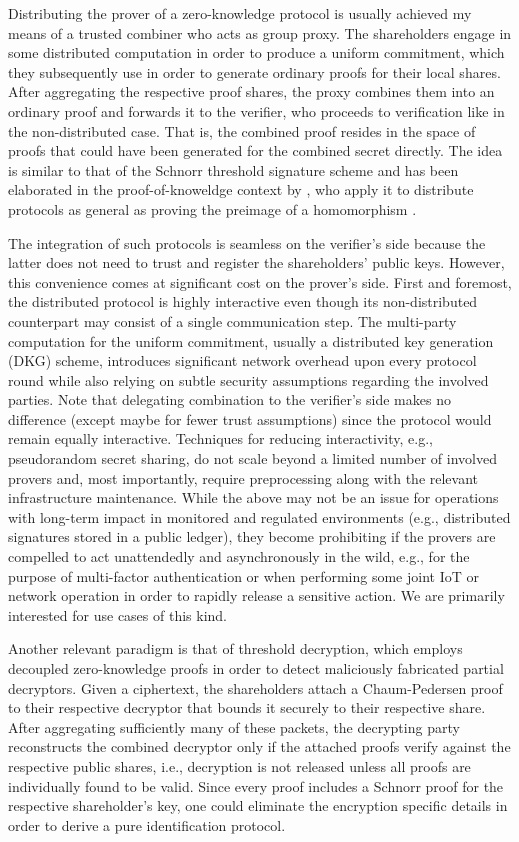 \documentclass[10pt, psamsfonts, reqno]{amsart}
\theoremstyle{definition}
\theoremstyle{remark}
\numberwithin{equation}{section}
\begin{document}
Distributing the prover of a zero-knowledge protocol
is usually achieved my means of a trusted combiner
who acts as group proxy.
The shareholders engage in some distributed computation
in order to produce a uniform commitment,
which they subsequently use in order to generate
ordinary proofs for their local shares.
After aggregating
the respective proof shares,
the proxy combines them into an ordinary proof
and forwards it to the verifier,
who proceeds to verification like in the non-distributed case.
That is, the combined proof resides in the space of proofs
that could have been generated for the combined secret directly.
The idea is similar to that of the
Schnorr threshold signature scheme
\cite{paper_stinson_strobl}
and has been elaborated
in the proof-of-knoweldge context by \cite{paper_threshold_zk},
who apply it to distribute protocols as general as
proving the preimage of a homomorphism \cite{paper_homomorphism}.

The integration of such protocols
is seamless on the verifier's side
because the latter does not need
to trust and register the shareholders' public keys.
However, this convenience comes at significant cost on the prover's side.
First and foremost, the distributed protocol
is highly interactive even though its non-distributed
counterpart may consist of a single communication step.
The multi-party computation
for the uniform commitment,
usually a distributed key generation (DKG) scheme,
introduces significant network overhead upon every protocol round
while also relying on subtle
security assumptions regarding the involved parties.
Note that delegating combination
to the verifier's side makes no difference
(except maybe for fewer trust assumptions)
since the protocol would remain equally interactive.
Techniques for reducing interactivity,
e.g., pseudorandom secret sharing, do not scale beyond
a limited number of involved provers and,
most importantly, require preprocessing
along with the relevant infrastructure maintenance.
While the above may not be an issue
for operations with long-term impact
in monitored and regulated environments
(e.g., distributed signatures stored in a public ledger),
they become prohibiting if the provers
are compelled to act unattendedly and asynchronously
in the wild,
e.g., for the purpose of multi-factor authentication
or when performing some joint IoT or network operation
in order to rapidly release a sensitive action.
We are primarily interested for use cases of this kind.

Another relevant paradigm is that of threshold decryption,
which employs decoupled zero-knowledge proofs
in order to detect maliciously fabricated partial decryptors.
Given a ciphertext, the shareholders attach
a Chaum-Pedersen proof to their respective decryptor
that bounds it securely to their respective share.
After aggregating sufficiently many of these packets,
the decrypting party reconstructs the combined decryptor
only if the attached proofs verify against the respective
public shares, i.e., decryption is not released
unless all proofs are individually found to be valid.
Since every proof
includes a Schnorr proof for the respective shareholder's key,
one could eliminate the encryption specific details
in order to derive a pure identification protocol.
\end{document}
